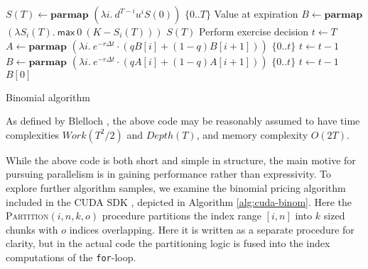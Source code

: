 \begin{algorithm}

\begin{algorithmic}
  \State $S(T) \gets \mathbf{parmap}$ $(\lambda i.\ d^{T-i}u^{i}S(0))$ $\{0..T\}$ \Comment Value at expiration
  \State $B \gets \mathbf{parmap}$ $(\lambda S_i(T).\ \mathsf{max}\ 0\ (K-S_i(T)))$ $S(T)$ \Comment Perform exercise decision
  \State $t \gets T$
    \State $A \gets \mathbf{parmap}$ $(\lambda i.\ e^{-r\Delta t} \cdot (qB[i] + (1-q)B[i+1]))$ $\{0..t\}$
    \State $t \gets t-1$
    \State $B \gets \mathbf{parmap}$ $(\lambda i.\ e^{-r\Delta t} \cdot (qA[i] + (1-q)A[i+1]))$ $\{0..t\}$
    \State $t \gets t-1$
  \EndWhile
  \State \Return $B[0]$
\EndFunction
\end{algorithmic}

  \caption{Binomial algorithm}
  \label{alg:binomial-algorithm}
\end{algorithm}

As defined by Blelloch \cite{blelloch1996programming}, the above code
may be reasonably assumed to have time complexities $Work(T^2/2)$ and
$Depth(T)$, and memory complexity $O(2T)$.

While the above code is both short and simple in structure, the main motive for
pursuing parallelism is in gaining performance rather than expressivity.  To
explore further algorithm samples, we examine the binomial pricing algorithm
included in the CUDA SDK \cite{CUDAbinomial}, depicted in Algorithm
\ref{alg:cuda-binom}. Here the \textsc{Partition}$(i,n,k,o)$ procedure
partitions the index range $[i,n]$ into $k$ sized chunks with $o$ indices
overlapping. Here it is written as a separate procedure for clarity, but in the
actual code the partitioning logic is fused into the index computations of the
\texttt{for}-loop.

